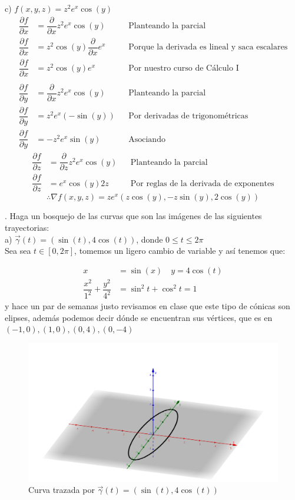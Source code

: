 \documentclass[letterpaper]{article}
\renewcommand{\d}{\partial}
\renewcommand{\*}{\cdot}
\theoremstyle{definition}
\begin{document}
\noindent c) $f(x,y,z) = z^2e^x\cos(y)$
\begin{align*}
	\dfrac{\d f}{\d x} &= \dfrac{\d}{\d x} z^2e^x\cos(y) &&\text{Planteando la parcial}\\
	\dfrac{\d f}{\d x} &= z^2\cos(y)\dfrac{\d}{\d x} e^x &&\text{Porque la derivada es lineal y saca escalares}\\
	\dfrac{\d f}{\d x} &= z^2\cos(y)e^x &&\text{Por nuestro curso de Cálculo I}\\
	\\
	\dfrac{\d f}{\d y} &= \dfrac{\d}{\d x} z^2e^x\cos(y) &&\text{Planteando la parcial}\\
	\dfrac{\d f}{\d y} &= z^2e^x(-\sin(y)) &&\text{Por derivadas de trigonométricas}\\
	\dfrac{\d f}{\d y} &= -z^2e^x\sin(y) &&\text{Asociando }
\end{align*}
\begin{align*}
		\dfrac{\d f}{\d z} &= \dfrac{\d}{\d z} z^2e^x\cos(y) &&\text{Planteando la parcial}\\
	\dfrac{\d f}{\d z} &= e^x\cos(y)2z &&\text{Por reglas de la derivada de exponentes}
\end{align*}
\[ \therefore \nabla f(x,y,z) = ze^x(z\cos(y), -z\sin(y), 2\cos(y)) \]



. Haga un bosquejo de las curvas que son las imágenes de las siguientes trayectorias:\\


\noindent a) $\vec{\gamma}(t) = (\sin(t), 4\cos(t))$, donde $0 \leq t \leq 2\pi$\\
Sea sea $ t \in [0,2\pi] $, tomemos un ligero cambio de variable y así tenemos que:

\begin{align*}
x &= \sin(x)  \quad y= 4\cos(t)\\
\dfrac{x^2 }{1^2}+ \dfrac{y^2}{4^2} &= 	\sin^2t + \cos^2t = 1
\end{align*}
y hace un par de semanas justo revisamos en clase que este tipo de cónicas son elipses, además podemos decir dónde se encuentran sus vértices, que es en $ (-1,0),(1,0),(0,4),(0,-4) $\\

\begin{figure}[h!]
	\centering
	\includegraphics[width=\textwidth]{img/proyecto4_5.png}
	\caption{Curva trazada por $ \vec{\gamma}(t) = (\sin(t), 4\cos(t))$}
\end{figure}
\end{document}
